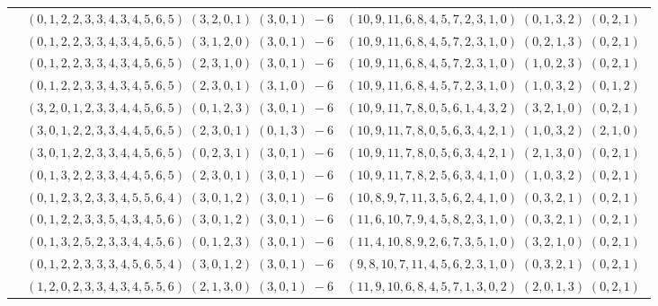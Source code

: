 \documentclass[11pt]{article}
\begin{document}
\begin{longtable}[l]{|c|c|c|}
 \cline{2-3} 
 & $(0 ,1 ,2 ,2 ,3 ,3 ,4 ,3 ,4 ,5 ,6 ,5) \;(3 ,2 ,0 ,1) \;(3 ,0 ,1) \;-6$ & $(10 ,9 ,11 ,6 ,8 ,4 ,5 ,7 ,2 ,3 ,1 ,0) \;(0 ,1 ,3 ,2) \;(0 ,2 ,1) \;$\\ 
 \cline{2-3} 
 & $(0 ,1 ,2 ,2 ,3 ,3 ,4 ,3 ,4 ,5 ,6 ,5) \;(3 ,1 ,2 ,0) \;(3 ,0 ,1) \;-6$ & $(10 ,9 ,11 ,6 ,8 ,4 ,5 ,7 ,2 ,3 ,1 ,0) \;(0 ,2 ,1 ,3) \;(0 ,2 ,1) \;$\\ 
 \cline{2-3} 
 & $(0 ,1 ,2 ,2 ,3 ,3 ,4 ,3 ,4 ,5 ,6 ,5) \;(2 ,3 ,1 ,0) \;(3 ,0 ,1) \;-6$ & $(10 ,9 ,11 ,6 ,8 ,4 ,5 ,7 ,2 ,3 ,1 ,0) \;(1 ,0 ,2 ,3) \;(0 ,2 ,1) \;$\\ 
 \cline{2-3} 
 & $(0 ,1 ,2 ,2 ,3 ,3 ,4 ,3 ,4 ,5 ,6 ,5) \;(2 ,3 ,0 ,1) \;(3 ,1 ,0) \;-6$ & $(10 ,9 ,11 ,6 ,8 ,4 ,5 ,7 ,2 ,3 ,1 ,0) \;(1 ,0 ,3 ,2) \;(0 ,1 ,2) \;$\\ 
 \cline{2-3} 
 & $(3 ,2 ,0 ,1 ,2 ,3 ,3 ,4 ,4 ,5 ,6 ,5) \;(0 ,1 ,2 ,3) \;(3 ,0 ,1) \;-6$ & $(10 ,9 ,11 ,7 ,8 ,0 ,5 ,6 ,1 ,4 ,3 ,2) \;(3 ,2 ,1 ,0) \;(0 ,2 ,1) \;$\\ 
 \cline{2-3} 
 & $(3 ,0 ,1 ,2 ,2 ,3 ,3 ,4 ,4 ,5 ,6 ,5) \;(2 ,3 ,0 ,1) \;(0 ,1 ,3) \;-6$ & $(10 ,9 ,11 ,7 ,8 ,0 ,5 ,6 ,3 ,4 ,2 ,1) \;(1 ,0 ,3 ,2) \;(2 ,1 ,0) \;$\\ 
 \cline{2-3} 
 & $(3 ,0 ,1 ,2 ,2 ,3 ,3 ,4 ,4 ,5 ,6 ,5) \;(0 ,2 ,3 ,1) \;(3 ,0 ,1) \;-6$ & $(10 ,9 ,11 ,7 ,8 ,0 ,5 ,6 ,3 ,4 ,2 ,1) \;(2 ,1 ,3 ,0) \;(0 ,2 ,1) \;$\\ 
 \cline{2-3} 
 & $(0 ,1 ,3 ,2 ,2 ,3 ,3 ,4 ,4 ,5 ,6 ,5) \;(2 ,3 ,0 ,1) \;(3 ,0 ,1) \;-6$ & $(10 ,9 ,11 ,7 ,8 ,2 ,5 ,6 ,3 ,4 ,1 ,0) \;(1 ,0 ,3 ,2) \;(0 ,2 ,1) \;$\\ 
 \cline{2-3} 
 & $(0 ,1 ,2 ,3 ,2 ,3 ,3 ,4 ,5 ,5 ,6 ,4) \;(3 ,0 ,1 ,2) \;(3 ,0 ,1) \;-6$ & $(10 ,8 ,9 ,7 ,11 ,3 ,5 ,6 ,2 ,4 ,1 ,0) \;(0 ,3 ,2 ,1) \;(0 ,2 ,1) \;$\\ 
 \cline{2-3} 
 & $(0 ,1 ,2 ,2 ,3 ,3 ,5 ,4 ,3 ,4 ,5 ,6) \;(3 ,0 ,1 ,2) \;(3 ,0 ,1) \;-6$ & $(11 ,6 ,10 ,7 ,9 ,4 ,5 ,8 ,2 ,3 ,1 ,0) \;(0 ,3 ,2 ,1) \;(0 ,2 ,1) \;$\\ 
 \cline{2-3} 
 & $(0 ,1 ,3 ,2 ,5 ,2 ,3 ,3 ,4 ,4 ,5 ,6) \;(0 ,1 ,2 ,3) \;(3 ,0 ,1) \;-6$ & $(11 ,4 ,10 ,8 ,9 ,2 ,6 ,7 ,3 ,5 ,1 ,0) \;(3 ,2 ,1 ,0) \;(0 ,2 ,1) \;$\\ 
 \cline{2-3} 
 & $(0 ,1 ,2 ,2 ,3 ,3 ,3 ,4 ,5 ,6 ,5 ,4) \;(3 ,0 ,1 ,2) \;(3 ,0 ,1) \;-6$ & $(9 ,8 ,10 ,7 ,11 ,4 ,5 ,6 ,2 ,3 ,1 ,0) \;(0 ,3 ,2 ,1) \;(0 ,2 ,1) \;$\\ 
 \cline{2-3} 
 & $(1 ,2 ,0 ,2 ,3 ,3 ,4 ,3 ,4 ,5 ,5 ,6) \;(2 ,1 ,3 ,0) \;(3 ,0 ,1) \;-6$ & $(11 ,9 ,10 ,6 ,8 ,4 ,5 ,7 ,1 ,3 ,0 ,2) \;(2 ,0 ,1 ,3) \;(0 ,2 ,1) \;$\\ 

\end{longtable}
\end{document}
